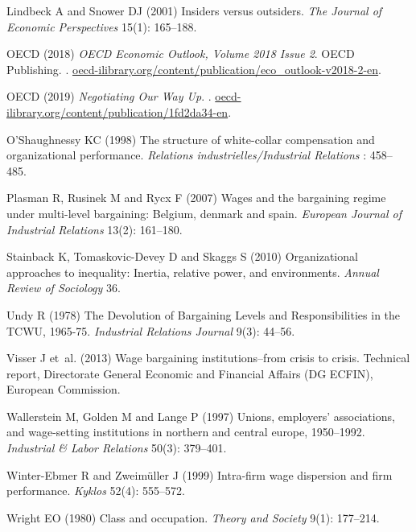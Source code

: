 \documentclass[Review,times,sageh,11pt]{sagej}
\begin{document}
\begin{thebibliography}{38}
Lindbeck A and Snower DJ (2001) Insiders versus outsiders.
\newblock \emph{The Journal of Economic Perspectives} 15(1): 165--188.

OECD (2018) \emph{OECD Economic Outlook, Volume 2018 Issue 2}.
\newblock OECD Publishing.
\newblock
  .
\newblock
  \urlprefix\url{oecd-ilibrary.org/content/publication/eco\_outlook-v2018-2-en}.

OECD (2019) \emph{Negotiating Our Way Up}.
\newblock {}.
\newblock
  \urlprefix\url{oecd-ilibrary.org/content/publication/1fd2da34-en}.

O'Shaughnessy KC (1998) The structure of white-collar compensation and
  organizational performance.
\newblock \emph{Relations industrielles/Industrial Relations} : 458--485.

Plasman R, Rusinek M and Rycx F (2007) Wages and the bargaining regime under
  multi-level bargaining: Belgium, denmark and spain.
\newblock \emph{European Journal of Industrial Relations} 13(2): 161--180.

Stainback K, Tomaskovic-Devey D and Skaggs S (2010) Organizational approaches
  to inequality: Inertia, relative power, and environments.
\newblock \emph{Annual Review of Sociology} 36.

Undy R (1978) {The Devolution of Bargaining Levels and Responsibilities in the
  TCWU, 1965-75}.
\newblock \emph{Industrial Relations Journal} 9(3): 44--56.

Visser J et~al. (2013) Wage bargaining institutions--from crisis to crisis.
\newblock Technical report, Directorate General Economic and Financial Affairs
  (DG ECFIN), European Commission.

Wallerstein M, Golden M and Lange P (1997) Unions, employers' associations, and
  wage-setting institutions in northern and central europe, 1950--1992.
\newblock \emph{Industrial \& Labor Relations} 50(3): 379--401.

Winter-Ebmer R and Zweim{\"u}ller J (1999) Intra-firm wage dispersion and firm
  performance.
\newblock \emph{Kyklos} 52(4): 555--572.

Wright EO (1980) Class and occupation.
\newblock \emph{Theory and Society} 9(1): 177--214.

\end{thebibliography}
\end{document}
